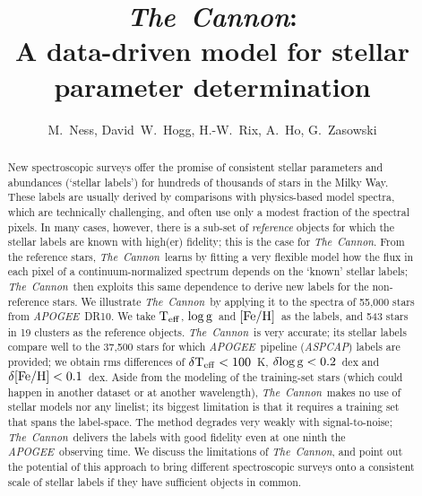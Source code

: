 \documentclass[12pt, preprint]{aastex}
\newcommand{\tc}{\textsl{The~Cannon}}
\newcommand{\apogee}{\textsl{APOGEE}}
\newcommand{\aspcap}{\textsl{ASPCAP}}
\newcommand{\teff}{\mbox{$\rm T_{eff}$}}
\newcommand{\feh}{\mbox{$\rm [Fe/H]$}}
\newcommand{\logg}{\mbox{$\rm \log g$}}
\begin{document}
\title{\tc:\\ A data-driven model for stellar parameter determination}
\author{M.~Ness,  
David~W.~Hogg, 
H.-W.~Rix, 
A.~Ho, 
G.~Zasowski}

\begin{abstract}%
New spectroscopic surveys offer the promise of consistent stellar
parameters and abundances (`stellar labels') for hundreds of thousands
of stars in the Milky Way. 
These labels are usually derived by comparisons with physics-based
model spectra, which are technically challenging, and often use only a
modest fraction of the spectral pixels. 
In many cases, however, there is a sub-set of \emph{reference}
objects for which the stellar labels are known with high(er)
fidelity; this is the case for \tc.
From the reference stars, \tc\ learns by fitting a very flexible
model how the flux in each pixel of a continuum-normalized spectrum
depends on the `known' stellar labels; \tc\ then exploits this same
dependence to derive new labels for the non-reference stars.
We illustrate \tc\ by applying it to the spectra of 55,000 stars from
\apogee\ DR10. 
We take \teff, \logg\ and \feh\ as the labels, and 543 stars in 19
clusters as the reference objects. 
\tc\ is very accurate; its stellar labels compare well to the 37,500
stars for which \apogee\ pipeline (\aspcap) labels are provided; we
obtain rms differences of $\delta\teff< 100$~K, $\delta\logg< 0.2$~dex
and $\delta\feh< 0.1$~dex.
Aside from the modeling of the training-set stars (which could happen
in another dataset or at another wavelength), \tc\ makes no use of
stellar models nor any linelist; its biggest limitation is that it
requires a training set that spans the label-space. 
The method degrades very weakly with signal-to-noise; \tc\ delivers
the labels with good fidelity even at one ninth the
\apogee\ observing time. 
We discuss the limitations of \tc, and point out the potential of this
approach to bring different spectroscopic surveys onto a consistent
scale of stellar labels if they have sufficient objects in common.
\end{abstract}
\end{document}
